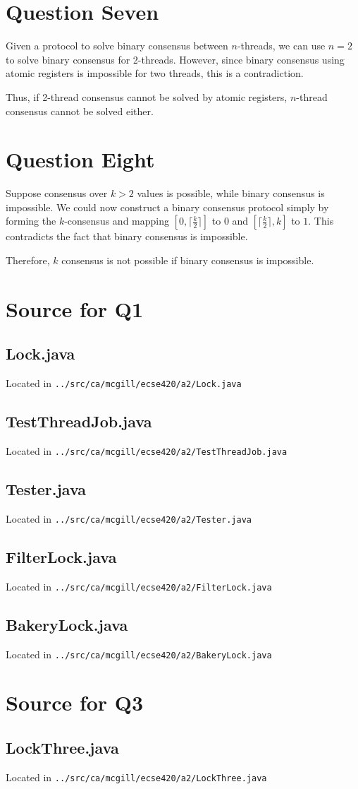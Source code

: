\documentclass[12pt,letterpaper,titlepage]{article}
\begin{document}
  \section{Question Seven}
    Given a protocol to solve binary consensus between $n$-threads, we can use $n=2$ to solve binary consensus for 2-threads. However, since binary consensus using atomic registers is impossible for two threads, this is a contradiction.
    
    Thus, if 2-thread consensus cannot be solved by atomic registers, $n$-thread consensus cannot be solved either.
    
  \section{Question Eight}
    Suppose consensus over $k > 2$ values is possible, while binary consensus
    is impossible. We could now construct a binary consensus protocol simply by forming
    the $k$-consensus and mapping $[0, \lceil \frac{k}{2} \rceil]$ to $0$ and $[\lceil \frac{k}{2} \rceil, k]$ to $1$. This contradicts the fact that binary consensus is impossible.
    
    Therefore, $k$ consensus is not possible if binary consensus is impossible.
    
  \newpage
  \begin{appendices}
    \newcommand{\srcfile}[1]{
    \subsection{#1.java}
    Located in \texttt{../src/ca/mcgill/ecse420/a2/#1.java}
    
    }
    \section{Source for Q1}
    \srcfile{Lock}
    \srcfile{TestThreadJob}
    \srcfile{Tester}
    \srcfile{FilterLock}
    \srcfile{BakeryLock}
    \section{Source for Q3}
    \srcfile{LockThree}
  \end{appendices}
  
\end{document}
